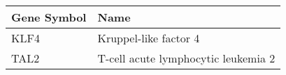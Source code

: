 \begin{tabular}{ll}
\toprule
Gene Symbol &                                Name \\
\midrule
       KLF4 &               Kruppel-like factor 4 \\
       TAL2 & T-cell acute lymphocytic leukemia 2 \\
\bottomrule
\end{tabular}
